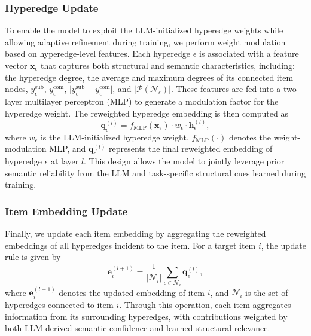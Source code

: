 \subsubsection{Hyperedge Update}
To enable the model to exploit the LLM-initialized hyperedge weights while allowing adaptive refinement during training, we perform weight modulation based on hyperedge-level features. Each hyperedge $\epsilon$ is associated with a feature vector $\mathbf{x}_\epsilon$ that captures both structural and semantic characteristics, including:
the hyperedge degree, the average and maximum degrees of its connected item nodes, $y^\text{sub}_\epsilon$, $y^\text{com}_\epsilon$, $\lvert y^\text{sub}_\epsilon - y^\text{com}_\epsilon \rvert$, and $\lvert \mathcal{P}(\mathcal{N}_\epsilon) \rvert$.
These features are fed into a two-layer multilayer perceptron (MLP) to generate a modulation factor for the hyperedge weight. The reweighted hyperedge embedding is then computed as
\begin{equation}\label{eq:edge_update}
    \mathbf{q}_\epsilon^{(l)} = f_\text{MLP}(\mathbf{x}_\epsilon) \cdot w_\epsilon \cdot \mathbf{h}_\epsilon^{(l)},
\end{equation}
where $w_\epsilon$ is the LLM-initialized hyperedge weight, $f_\text{MLP}(\cdot)$ denotes the weight-modulation MLP, and $\mathbf{q}_\epsilon^{(l)}$ represents the final reweighted embedding of hyperedge $\epsilon$ at layer $l$. This design allows the model to jointly leverage prior semantic reliability from the LLM and task-specific structural cues learned during training.

\subsubsection{Item Embedding Update}
Finally, we update each item embedding by aggregating the reweighted embeddings of all hyperedges incident to the item. For a target item $i$, the update rule is given by
\begin{equation}\label{eq:item_update}
    \mathbf{e}_i^{(l+1)} = \frac{1}{|\mathcal{N}_i|} \sum_{\epsilon \in \mathcal{N}_i} \mathbf{q}^{(l)}_{\epsilon},
\end{equation}
where $\mathbf{e}_{i}^{(l+1)}$ denotes the updated embedding of item $i$, and $\mathcal{N}_i$ is the set of hyperedges connected to item $i$. Through this operation, each item aggregates information from its surrounding hyperedges, with contributions weighted by both LLM-derived semantic confidence and learned structural relevance.

